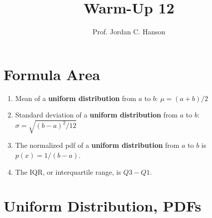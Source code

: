 \documentclass{article}
\begin{document}
\title{Warm-Up 12}
\author{Prof. Jordan C. Hanson}

\maketitle

\section{Formula Area}

\begin{enumerate}
\item Mean of a \textbf{uniform distribution} from $a$ to $b$: $\mu = (a+b)/2$
\item Standard deviation of a \textbf{uniform distribution} from $a$ to $b$: $\sigma = \sqrt{(b-a)^2/12}$
\item The normalized pdf of a \textbf{uniform distribution} from $a$ to $b$ is $p(x) = 1/(b-a)$.
\item The IQR, or interquartile range, is $Q3 - Q1$.
\end{enumerate}

\section{Uniform Distribution, PDFs}
\end{document}

